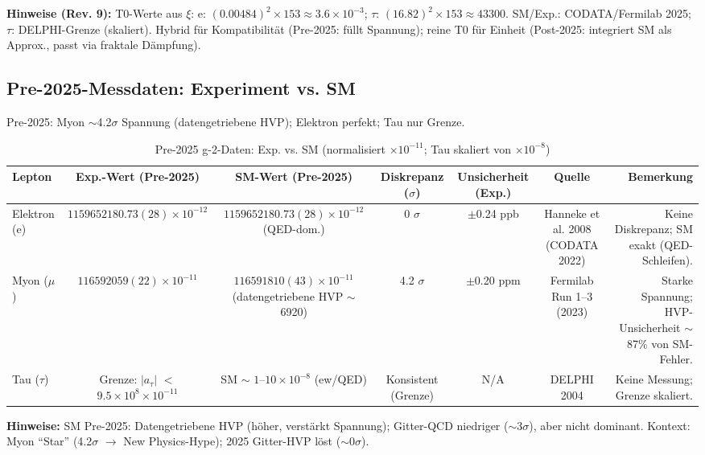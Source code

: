 \documentclass[12pt,a4paper]{article}
\theoremstyle{definition}
\begin{document}
	\textbf{Hinweise (Rev. 9):} T0-Werte aus $\xi$: e: $(0.00484)^2 \times 153 \approx 3.6 \times 10^{-3}$; $\tau$: $(16.82)^2 \times 153 \approx 43300$. SM/Exp.: CODATA/Fermilab 2025; $\tau$: DELPHI-Grenze (skaliert). Hybrid für Kompatibilität (Pre-2025: füllt Spannung); reine T0 für Einheit (Post-2025: integriert SM als Approx., passt via fraktale Dämpfung).
	
	\subsection{Pre-2025-Messdaten: Experiment vs. SM}
	
	Pre-2025: Myon $\sim$4.2$\sigma$ Spannung (datengetriebene HVP); Elektron perfekt; Tau nur Grenze.
	
	\begin{table}[ht!]
		\centering
		\small
		\begin{adjustbox}{max width=\textwidth}
			\begin{tabular}{@{}lcccccr@{}}
				\toprule
				Lepton & Exp.-Wert (Pre-2025) & SM-Wert (Pre-2025) & Diskrepanz ($\sigma$) & Unsicherheit (Exp.) & Quelle & Bemerkung \\
				\midrule
				Elektron (e) & $1159652180.73(28) \times 10^{-12}$ & $1159652180.73(28) \times 10^{-12}$ (QED-dom.) & 0 $\sigma$ & $\pm$0.24 ppb & Hanneke et al. 2008 (CODATA 2022) & Keine Diskrepanz; SM exakt (QED-Schleifen). \\
				Myon ($\mu$) & $116592059(22) \times 10^{-11}$ & $116591810(43) \times 10^{-11}$ (datengetriebene HVP $\sim$6920) & 4.2 $\sigma$ & $\pm$0.20 ppm & Fermilab Run 1--3 (2023) & Starke Spannung; HVP-Unsicherheit $\sim$87\% von SM-Fehler. \\
				Tau ($\tau$) & Grenze: $|a_\tau|$ $<$ $9.5 \times 10^{8} \times 10^{-11}$ & SM $\sim$ $1$--$10 \times 10^{-8}$ (ew/QED) & Konsistent (Grenze) & N/A & DELPHI 2004 & Keine Messung; Grenze skaliert. \\
				\bottomrule
			\end{tabular}
		\end{adjustbox}
		\caption{Pre-2025 g-2-Daten: Exp. vs. SM (normalisiert $ \times 10^{-11}$; Tau skaliert von $ \times 10^{-8}$)}
		\label{tab:pre2025}
	\end{table}
	
	\textbf{Hinweise:} SM Pre-2025: Datengetriebene HVP (höher, verstärkt Spannung); Gitter-QCD niedriger ($\sim$3$\sigma$), aber nicht dominant. Kontext: Myon ``Star'' (4.2$\sigma$ $\to$ New Physics-Hype); 2025 Gitter-HVP löst ($\sim$0$\sigma$).
	
\end{document}
